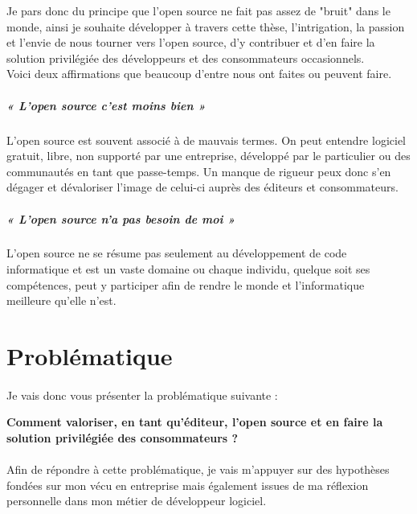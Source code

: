 			Je pars donc du principe que l'open source ne fait pas assez de "bruit" dans le monde, ainsi je souhaite développer à travers cette thèse, l'intrigation, la passion et l'envie de nous tourner vers l'open source, d'y contribuer et d'en faire la solution privilégiée des développeurs et des consommateurs occasionnels.\\

			Voici deux affirmations que beaucoup d'entre nous ont faites ou peuvent faire.
			
			\subparagraph{« L'open source c'est moins bien »\\}

				L'open source est souvent associé à de mauvais termes. On peut entendre logiciel gratuit, libre, non supporté par une entreprise, développé par le particulier ou des communautés en tant que passe-temps. Un manque de rigueur peux donc s'en dégager et dévaloriser l'image de celui-ci auprès des éditeurs et consommateurs.

			\subparagraph{« L'open source n'a pas besoin de moi »\\}

				L'open source ne se résume pas seulement au développement de code informatique et est un vaste domaine ou chaque individu, quelque soit ses compétences, peut y participer afin de rendre le monde et l'informatique meilleure qu'elle n'est.

	\section{Problématique}
		\paragraph*{}

			Je vais donc vous présenter la problématique suivante :
			\begin{center}
				\begin{displayquote}
					\textbf{Comment valoriser, en tant qu'éditeur, l'open source et en faire la solution privilégiée des consommateurs ?}
				\end{displayquote}
			\end{center}

		\paragraph*{}
			
			Afin de répondre à cette problématique, je vais m'appuyer sur des hypothèses fondées sur mon vécu en entreprise mais également issues de ma réflexion personnelle dans mon métier de développeur logiciel.

